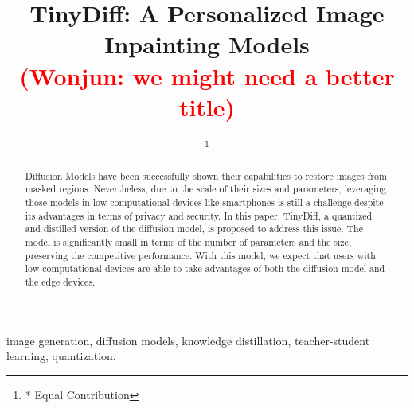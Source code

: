 \documentclass[conference]{IEEEtran}
\newcommand{\WP}[1]{\textcolor{red}{(Wonjun: #1)}}
\begin{document}
\title{TinyDiff: A Personalized Image Inpainting Models \\
{\footnotesize \WP{we might need a better title}}
}

\author{
\thanks{* Equal Contribution}
}

\maketitle

\begin{abstract}
    Diffusion Models have been successfully shown their capabilities to restore images from masked regions.
    Nevertheless, due to the scale of their sizes and parameters,
    leveraging those models in low computational devices like smartphones is still a challenge
    despite its advantages in terms of privacy and security.
    In this paper, TinyDiff, a quantized and distilled version of the diffusion model, is proposed to address this issue.
    The model is significantly small in terms of the number of parameters and the size, preserving the competitive performance.
    With this model, we expect that users with low computational devices are able to take advantages of both the diffusion model and the edge devices.
\end{abstract}

\begin{IEEEkeywords}
    image generation, diffusion models, knowledge distillation, teacher-student learning, quantization.
\end{IEEEkeywords}












\end{document}
